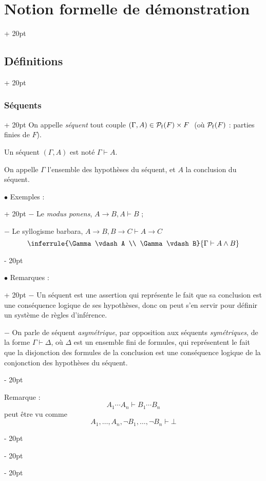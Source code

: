 \documentclass[a4paper, 12pt, twoside]{article}
\newcommand{\ind}[1][20pt]{\advance\leftskip + #1}
\newcommand{\deind}[1][20pt]{\advance\leftskip - #1}
\newenvironment{indt}[2][20pt]{#2 \par \ind[#1]}{\par \deind} %
\begin{document}
\begin{indt}{\section{Notion formelle de démonstration}}
\begin{indt}{\subsection{Définitions}}
\begin{indt}{\subsubsection{Séquents}}
                On appelle \emph{séquent} tout couple $(\Gamma, A) \in \mathcal P_{\rm f}(F) \times F\ $ (où $\mathcal P_{\rm f}(F)$ : parties finies de $F$).

                Un séquent $(\Gamma, A)$ est noté $\Gamma \vdash A$.

                On appelle $\Gamma$ l'ensemble des hypothèses du séquent, et $A$ la conclusion du séquent.

                \vspace{12pt}
                
                \begin{indt}{$\bullet$ Exemples :}
                    $-$ Le \textit{modus ponens}, $A \rightarrow B, A \vdash B$ ;

                    $-$ Le syllogisme barbara, $A \rightarrow B, B \rightarrow C \vdash A \rightarrow C$
                    \[
                        \inferrule{\Gamma \vdash A \\ \Gamma \vdash B}{\Gamma \vdash A \wedge B}
                    \]
                \end{indt}

                \vspace{12pt}
                
                \begin{indt}{$\bullet$ Remarques :}
                    $-$ Un séquent est une assertion qui représente le fait que sa conclusion est une conséquence logique de ses hypothèses, donc on peut s'en servir pour définir un système de règles d'inférence.

                    \vspace{6pt}
                    
                    $-$ On parle de séquent \emph{asymétrique}, par opposition aux séquents \emph{symétriques}, de la forme $\Gamma \vdash \Delta$, où $\Delta$ est un ensemble fini de formules, qui représentent le fait que la disjonction des formules de la conclusion est une conséquence logique de la conjonction des hypothèses du séquent.
                \end{indt}

                \vspace{12pt}
                
                Remarque :
                \[
                    A_1 \cdots A_n \vdash B_1 \cdots B_n
                \]
                peut être vu comme
                \[
                    A_1, \ldots, A_n, \neg B_1, \ldots, \neg B_n \vdash \bot
                \]


\end{indt}
\end{indt}
\end{indt}
\end{document}
